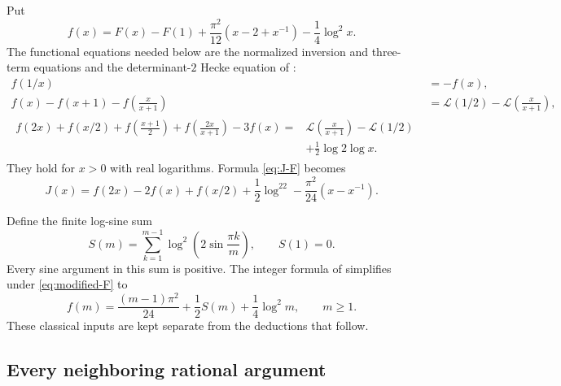 \documentclass[11pt]{article}
\numberwithin{equation}{section}
\theoremstyle{definition}
\theoremstyle{remark}
\newcommand{\Rog}{\mathcal L}
\begin{document}
Put
\begin{equation}\label{eq:modified-F}
 f(x)=F(x)-F(1)+\frac{\pi^2}{12}(x-2+x^{-1})-\frac14\log^2x.
\end{equation}
The functional equations needed below are the normalized inversion and
three-term equations and the determinant-$2$ Hecke equation of
\cite[(15), (22a)]{RZ}:
\begin{align}
 f(1/x)&=-f(x),\label{eq:f-inversion}\\
 f(x)-f(x+1)-f\left(\frac{x}{x+1}\right)
 &=\Rog(1/2)-\Rog\left(\frac{x}{x+1}\right),\label{eq:f-three}\\
 \begin{split}
 f(2x)+f(x/2)+f\left(\frac{x+1}{2}\right)
 +f\left(\frac{2x}{x+1}\right)-3f(x)
 ={}&\Rog\left(\frac{x}{x+1}\right)-\Rog(1/2)\\
 &+\tfrac12\log2\log x.
 \end{split}\label{eq:f-Hecke}
\end{align}
They hold for $x>0$ with real logarithms. Formula \eqref{eq:J-F}
becomes
\begin{equation}\label{eq:J-f}
 J(x)=f(2x)-2f(x)+f(x/2)+\frac12\log^22
       -\frac{\pi^2}{24}(x-x^{-1}).
\end{equation}

Define the finite log-sine sum
\begin{equation}\label{eq:S}
 S(m)=\sum_{k=1}^{m-1}\log^2\left(2\sin\frac{\pi k}{m}\right),
 \qquad S(1)=0.
\end{equation}
Every sine argument in this sum is positive. The integer formula of
\cite[(23)]{RZ} simplifies under \eqref{eq:modified-F} to
\begin{equation}\label{eq:f-integer}
 f(m)=\frac{(m-1)\pi^2}{24}+\frac12S(m)+\frac14\log^2m,
 \qquad m\ge1.
\end{equation}
These classical inputs are kept separate from the deductions that follow.

\subsection{Every neighboring rational argument}
\end{document}
